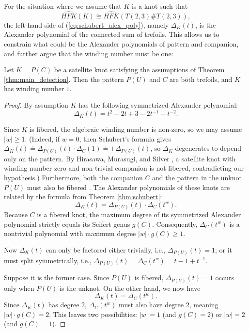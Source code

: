 For the situation where we assume that $K$ is a knot such that
\[
\widehat{HFK}(K) \cong \widehat{HFK}(T(2,3) \# T(2,3)),
\]
the left-hand side of (\ref{eq:schubert_alex_poly}), namely $\Delta_K(t)$, is the Alexander polynomial of the connected sum of trefoils. This allows us to constrain what could be the Alexander polynomials of pattern and companion, and further argue that the winding number must be one:

\begin{lemma}\label{lem:satellite_trefoils_windingnumber_1}
    Let $K = P(C)$ be a satellite knot satisfying the assumptions of Theorem \ref{thm:main_detection}. Then the pattern $P(U)$ and $C$ are both trefoils, and $K$ has winding number $1$.
\end{lemma}

\begin{proof}
By assumption $K$ has the following symmetrized Alexander polynomial:
\[
\Delta_K(t) = t^2 - 2t + 3 - 2t^{-1} + t^{-2}.
\]

Since $K$ is fibered, the algebraic winding number is non-zero, so we may assume $|w| \geq 1$. (Indeed, if $w = 0$, then Schubert's formula gives $\Delta_K(t) \doteq \Delta_{P(U)}(t) \cdot \Delta_C(1) \doteq \pm \Delta_{P(U)}(t)$, so $\Delta_K$ degenerates to depend only on the pattern. By Hirasawa, Murasugi, and Silver \cite[Theorem 1]{HirasawaMurasugiSilver2008}, a satellite knot with winding number zero and non-trivial companion is not fibered, contradicting our hypothesis.) Furthermore, both the companion $C$ and the pattern in the unknot $P(U)$ must also be fibered \cite[Corollary 4.15, Proposition 5.5]{BZ03}. The Alexander polynomials of these knots are related by the formula from Theorem \ref{thm:schubert}:
\[
\Delta_K(t) = \Delta_{P(U)}(t) \cdot \Delta_C(t^w).
\]
Because $C$ is a fibered knot, the maximum degree of its symmetrized Alexander polynomial strictly equals its Seifert genus $g(C)$. Consequently, $\Delta_C(t^w)$ is a nontrivial polynomial with maximum degree $|w| \cdot g(C) \geq 1$.

Now $\Delta_K(t)$ can only be factored either trivially, i.e., $\Delta_{P(U)}(t) = 1$; or it must split symmetrically, i.e., $\Delta_{P(U)}(t) = \Delta_C(t^w) = t - 1 + t^{-1}$.

Suppose it is the former case. Since $P(U)$ is fibered, $\Delta_{P(U)}(t) = 1$ occurs only when $P(U)$ is the unknot. On the other hand, we now have
\[
\Delta_K(t) = \Delta_C(t^w).
\]
Since $\Delta_K(t)$ has degree $2$, $\Delta_C(t^w)$ must also have degree $2$, meaning $|w| \cdot g(C) = 2$. This leaves two possibilities: $|w|=1$ (and $g(C)=2$) or $|w|=2$ (and $g(C)=1$).


\end{proof}
